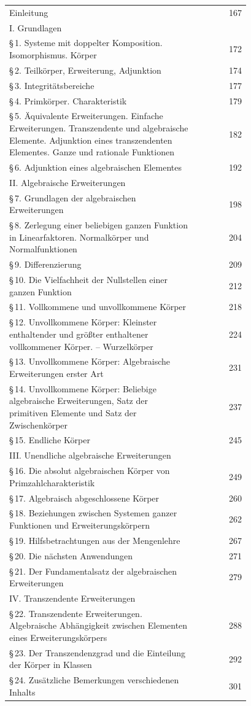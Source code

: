 \begin{tabular}{p{0.78\linewidth}r}
Einleitung & 167\\
I. Grundlagen & \\
\quad \S\,1. Systeme mit doppelter Komposition. Isomorphismus. Körper & 172\\
\quad \S\,2. Teilkörper, Erweiterung, Adjunktion & 174\\
\quad \S\,3. Integritätsbereiche & 177\\
\quad \S\,4. Primkörper. Charakteristik & 179\\
\quad \S\,5. Äquivalente Erweiterungen. Einfache Erweiterungen. Transzendente und algebraische Elemente. Adjunktion eines transzendenten Elementes. Ganze und rationale Funktionen & 182\\
\quad \S\,6. Adjunktion eines algebraischen Elementes & 192\\
II. Algebraische Erweiterungen & \\
\quad \S\,7. Grundlagen der algebraischen Erweiterungen & 198\\
\quad \S\,8. Zerlegung einer beliebigen ganzen Funktion in Linearfaktoren. Normalkörper und Normalfunktionen & 204\\
\quad \S\,9. Differenzierung & 209\\
\quad \S\,10. Die Vielfachheit der Nullstellen einer ganzen Funktion & 212\\
\quad \S\,11. Vollkommene und unvollkommene Körper & 218\\
\quad \S\,12. Unvollkommene Körper: Kleinster enthaltender und größter enthaltener vollkommener Körper. -- Wurzelkörper & 224\\
\quad \S\,13. Unvollkommene Körper: Algebraische Erweiterungen erster Art & 231\\
\quad \S\,14. Unvollkommene Körper: Beliebige algebraische Erweiterungen, Satz der primitiven Elemente und Satz der Zwischenkörper & 237\\
\quad \S\,15. Endliche Körper & 245\\
III. Unendliche algebraische Erweiterungen & \\
\quad \S\,16. Die absolut algebraischen Körper von Primzahlcharakteristik & 249\\
\quad \S\,17. Algebraisch abgeschlossene Körper & 260\\
\quad \S\,18. Beziehungen zwischen Systemen ganzer Funktionen und Erweiterungskörpern & 262\\
\quad \S\,19. Hilfsbetrachtungen aus der Mengenlehre & 267\\
\quad \S\,20. Die nächsten Anwendungen & 271\\
\quad \S\,21. Der Fundamentalsatz der algebraischen Erweiterungen & 279\\
IV. Transzendente Erweiterungen & \\
\quad \S\,22. Transzendente Erweiterungen. Algebraische Abhängigkeit zwischen Elementen eines Erweiterungskörpers & 288\\
\quad \S\,23. Der Transzendenzgrad und die Einteilung der Körper in Klassen & 292\\
\quad \S\,24. Zusätzliche Bemerkungen verschiedenen Inhalts & 301
\end{tabular}
